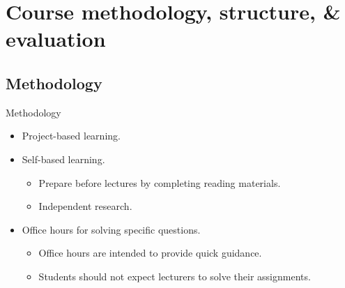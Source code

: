 \documentclass[]{slides}
\begin{document}
\section{Course methodology, structure, \& evaluation}
\subsection{Methodology}
\begin{frame}{Methodology}
\begin{itemize}
  \item Project-based learning.
  \item Self-based learning.
  \begin{itemize}
    \item Prepare before lectures by completing reading materials.
    \item Independent research.
  \end{itemize}
  \item Office hours for solving specific questions.
  \begin{itemize}
    \item Office hours are intended to provide quick guidance.
    \item Students should not expect lecturers to solve their assignments.      
  \end{itemize}
\end{itemize}
\end{frame}

\end{document}
